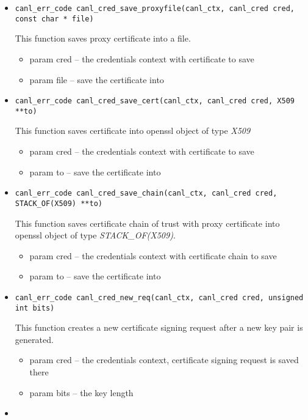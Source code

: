 \begin{itemize}
  \item \begin{verbatim}
canl_err_code canl_cred_save_proxyfile(canl_ctx, canl_cred cred,
const char * file)\end{verbatim}
  This function saves proxy certificate into a file.
  \begin{itemize}
    \item param cred -- the credentials context with certificate to save 
    \item param file -- save the certificate into 
  \end{itemize}
  \item \begin{verbatim}
canl_err_code canl_cred_save_cert(canl_ctx, canl_cred cred, X509 **to)\end{verbatim}
  This function saves certificate into openssl object of type \textit{X509}
  \begin{itemize}
    \item param cred -- the credentials context with certificate to save
    \item param to -- save the certificate into
  \end{itemize}
  \item \begin{verbatim}
canl_err_code canl_cred_save_chain(canl_ctx, canl_cred cred, STACK_OF(X509) **to)\end{verbatim}
  This function saves certificate chain of trust with proxy 
  certificate into openssl object of type \textit{STACK\_OF(X509)}.
  \begin{itemize}
   \item param cred -- the credentials context with certificate chain to save
    \item param to -- save the certificate into
  \end{itemize}
  \item \begin{verbatim}
canl_err_code canl_cred_new_req(canl_ctx, canl_cred cred, unsigned int bits)\end{verbatim}
  This function creates a new certificate signing request after a new key pair 
  is generated.
   \begin{itemize}
    \item param cred -- the credentials context, certificate signing request 
    is saved there
    \item param bits -- the key length
  \end{itemize}
  \item \begin{verbatim}

\end{verbatim}
\end{itemize}
